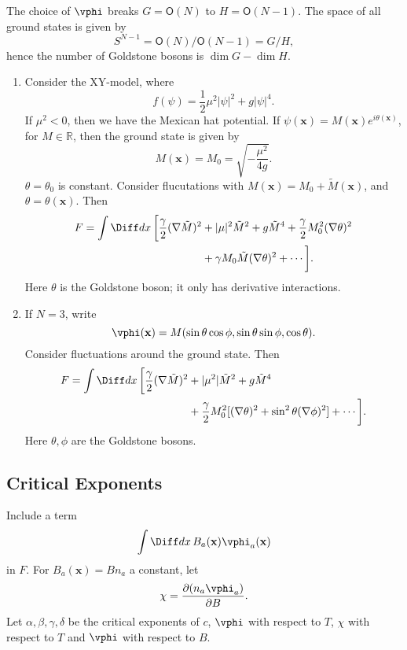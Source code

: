 \documentclass[12pt]{article}
\begin{document}

The choice of $\vphi$ breaks $G = \mathsf{O}(N)$ to $H = \mathsf{O}(N-1)$. The space of all ground states is given by
\[
S^{N-1} = \mathsf{O}(N) / \mathsf{O}(N-1) = G/H,
\]
hence the number of Goldstone bosons is $\dim G - \dim H$.

\begin{exbox}
	\begin{enumerate}
		\item Consider the XY-model, where
			\[
			f(\psi) = \frac 12 \mu^2 |\psi|^2 + g |\psi|^4.
			\]
			If $\mu^2 < 0$, then we have the Mexican hat potential. If $\psi(\mathbf{x}) = M(\mathbf{x}) e^{i \theta(\mathbf{x})}$, for $M \in \mathbb{R}$, then the ground state is given by
			\[
				M(\mathbf{x}) = M_0 = \sqrt{-\frac{\mu^2}{4g}}.
			\]
			$\theta = \theta_0$ is constant. Consider flucutations with $M(\mathbf{x}) = M_0 + \tilde M(\mathbf{x})$, and $\theta = \theta(\mathbf{x})$. Then
			\begin{align*}
				F = \int \Diff d x\, \biggl[ \frac{\gamma}{2} (\nabla \tilde M)^2 &+ |\mu|^2 \tilde M^2 + g \tilde M^4 + \frac{\gamma}{2} M_0^2 (\nabla \theta)^2 \\
												 &+ \gamma M_0 \tilde M(\nabla \theta)^2 + \cdots \biggr].
			\end{align*}
			Here $\theta$ is the Goldstone boson; it only has derivative interactions.
		\item If $N = 3$, write
			\[
			\vphi(\mathbf{x}) = M (\sin \theta \cos \phi, \sin \theta \sin \phi, \cos \theta).
			\]
			Consider fluctuations around the ground state. Then
			\begin{align*}
				F = \int \Diff d x\, \biggl[ \frac \gamma2 (\nabla \tilde M)^2 &+ |\mu^2|\tilde M^2 + g \tilde M^4 \\
				  &+ \frac \gamma2 M_0^2 [(\nabla \theta)^2 + \sin^2 \theta (\nabla \phi)^2] + \cdots \biggr].
			\end{align*}
			Here $\theta, \phi$ are the Goldstone bosons.
	\end{enumerate}	
\end{exbox}

\subsection{Critical Exponents}%
\label{sub:ces}

Include a term
\[
\int \Diff d x\, B_a(\mathbf{x}) \vphi_a(\mathbf{x})
\]
in $F$. For $B_a(\mathbf{x}) = B n_a$ a constant, let
\[
\chi = \frac{\partial (n_a \vphi_a)}{\partial B}.
\]
Let $\alpha, \beta, \gamma, \delta$ be the critical exponents of $c$, $\vphi$ with respect to $T$, $\chi$ with respect to $T$ and $\vphi$ with respect to $B$.
\end{document}
